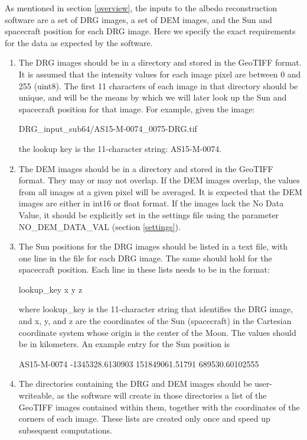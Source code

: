 \documentclass[letterpaper,fleqn,11pt]{report}
\begin{document}
As mentioned in section \ref{overview}, the inputs to the albedo reconstruction software are a set of DRG images, a set of DEM images, and the Sun and spacecraft position for each DRG image. Here we specify the exact requirements for the data as expected by the software.

\begin{enumerate}

\item The DRG images should be in a directory and stored in the GeoTIFF format. It is assumed that the intensity values for each image pixel are between 0 and 255 (uint8).  The first 11 characters of each image in that directory should be unique, and will be the means by which we will later look up the Sun and spacecraft position for that image. For example, given the image:

DRG\_input\_sub64/AS15-M-0074\_0075-DRG.tif

the lookup key is the 11-character string: AS15-M-0074.

\item The DEM images should be in a directory and stored in the GeoTIFF
format. They may or may not overlap. If the DEM images overlap, the
values from all images at a given pixel will be averaged. It is expected
that the DEM images are either in int16 or float format. If the
images lack the No Data Value, it should be explicitly set in the
settings file using the parameter NO\_DEM\_DATA\_VAL (section \ref{settings}).

\item The Sun positions for the DRG images should be listed in a text file,
 with one line in the file for each DRG image. The same should
hold for the spacecraft position. Each line in these lists needs to
be in the format: 

lookup\_key x y z

where lookup\_key is the 11-character string that identifies the DRG
image, and x, y, and z are the coordinates of the Sun (spacecraft)
 in the Cartesian coordinate system whose origin is the center of the
 Moon. The values should be in kilometers. An example entry for the Sun
 position is 

AS15-M-0074 -1345328.6130903 151849061.51791 689530.60102555

\item The directories containing the DRG and DEM images should be
  user-writeable, as the software will create in those directories a
  list of the GeoTIFF images contained within them, together with the
  coordinates of the corners of each image. These lists are created
  only once and speed up subsequent computations.

\end{enumerate}
\end{document}

